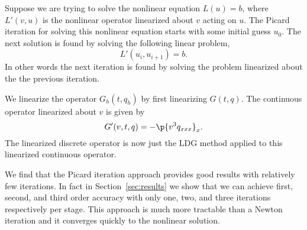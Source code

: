 Suppose we are trying to solve the nonlinear equation \(L(u) = b\), where
\(L'(v, u)\) is the nonlinear operator linearized about \(v\) acting on \(u\).
The Picard iteration for solving this nonlinear equation starts with some initial
guess \(u_0\).
The next solution is found by solving the following linear problem,
\begin{equation}
  L'(u_i, u_{i+1}) = b.
\end{equation}
In other words the next iteration is found by solving the problem linearized about
the the previous iteration.

We linearize the operator \(G_h(t, q_h)\) by first linearizing \(G(t, q)\).
The continuous operator linearized about \(v\) is given by
\begin{equation}
  G'(v, t, q) = - \p{v^3 q_{xxx}}_x.
\end{equation}
The linearized discrete operator is now just the LDG method applied to this
linearized continuous operator.

We find that the Picard iteration approach provides good results with relatively few
iterations.
In fact in Section~\ref{sec:results} we show that we can achieve first, second, and
third order accuracy with only one, two, and three iterations respectively per
stage.
This approach is much more tractable than a Newton iteration and it converges
quickly to the nonlinear solution.

\clearpage
\pagebreak